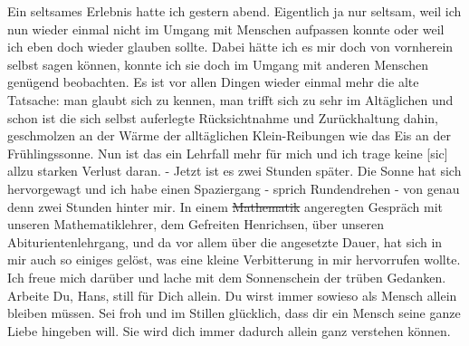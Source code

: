 \def\day{24. Oktober 1943}
\mktitle

Ein seltsames Erlebnis hatte ich gestern abend.
Eigentlich ja nur seltsam, weil ich nun wieder einmal nicht im Umgang mit Menschen aufpassen konnte oder weil ich eben doch wieder glauben sollte.
Dabei h\"{a}tte ich es mir doch von vornherein selbst sagen k\"{o}nnen, konnte ich sie doch im Umgang mit anderen Menschen gen\"{u}gend beobachten.
Es ist vor allen Dingen wieder einmal mehr die alte Tatsache: man glaubt sich zu kennen, man trifft sich zu sehr im Alt\"{a}glichen und schon ist die sich selbst auferlegte R\"{u}cksichtnahme und Zur\"{u}ckhaltung dahin, geschmolzen an der W\"{a}rme der allt\"{a}glichen Klein-Reibungen wie das Eis an der  Fr\"{u}hlingssonne.
Nun ist das ein Lehrfall mehr f\"{u}r mich und ich trage keine{\color{red} [sic] } allzu starken Verlust daran.
- Jetzt ist es zwei Stunden sp\"{a}ter.
Die Sonne hat sich hervorgewagt und ich habe einen Spaziergang - sprich Rundendrehen - von genau denn zwei Stunden hinter mir.
In einem \st{Mathematik} angeregten Gespr\"{a}ch mit unseren Mathematiklehrer, dem Gefreiten Henrichsen, \"{u}ber unseren Abiturientenlehrgang, und da vor allem \"{u}ber die angesetzte Dauer, hat sich in mir auch so einiges gel\"{o}st, was eine kleine Verbitterung in mir hervorrufen wollte.
Ich freue mich dar\"{u}ber und lache mit dem Sonnenschein der tr\"{u}ben Gedanken.
Arbeite Du, Hans, still f\"{u}r Dich allein.
Du wirst immer sowieso als Mensch allein bleiben m\"{u}ssen.
Sei froh und im Stillen gl\"{u}cklich, dass dir ein Mensch seine ganze Liebe hingeben will.
Sie wird dich immer dadurch allein ganz verstehen k\"{o}nnen.

\clearpage
